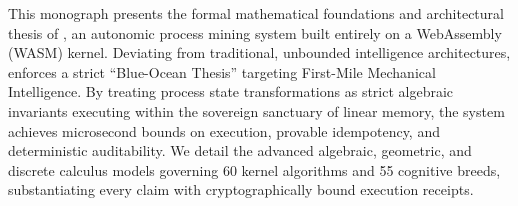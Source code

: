 This monograph presents the formal mathematical foundations and architectural thesis of , an autonomic process mining system built entirely on a WebAssembly (WASM) kernel. Deviating from traditional, unbounded intelligence architectures,  enforces a strict ``Blue-Ocean Thesis'' targeting First-Mile Mechanical Intelligence. By treating process state transformations as strict algebraic invariants executing within the sovereign sanctuary of linear memory, the system achieves microsecond bounds on execution, provable idempotency, and deterministic auditability. We detail the advanced algebraic, geometric, and discrete calculus models governing 60 kernel algorithms and 55 cognitive breeds, substantiating every claim with cryptographically bound execution receipts.
